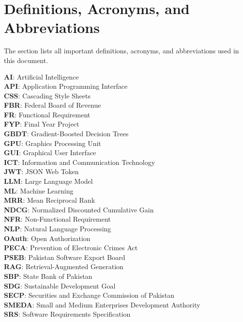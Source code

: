 \documentclass{FastFyp}
\begin{document}
\section{Definitions, Acronyms, and Abbreviations}\label{sec:defs}
The section lists all important definitions, acronyms, and abbreviations used in this document.

\textbf{AI}: Artificial Intelligence\\
\textbf{API}: Application Programming Interface\\
\textbf{CSS}: Cascading Style Sheets\\
\textbf{FBR}: Federal Board of Revenue\\
\textbf{FR}: Functional Requirement\\
\textbf{FYP}: Final Year Project\\
\textbf{GBDT}: Gradient-Boosted Decision Trees\\
\textbf{GPU}: Graphics Processing Unit\\
\textbf{GUI}: Graphical User Interface\\
\textbf{ICT}: Information and Communication Technology\\
\textbf{JWT}: JSON Web Token\\
\textbf{LLM}: Large Language Model\\
\textbf{ML}: Machine Learning\\
\textbf{MRR}: Mean Reciprocal Rank\\
\textbf{NDCG}: Normalized Discounted Cumulative Gain\\
\textbf{NFR}: Non-Functional Requirement\\
\textbf{NLP}: Natural Language Processing\\
\textbf{OAuth}: Open Authorization\\
\textbf{PECA}: Prevention of Electronic Crimes Act\\
\textbf{PSEB}: Pakistan Software Export Board\\
\textbf{RAG}: Retrieval-Augmented Generation\\
\textbf{SBP}: State Bank of Pakistan\\
\textbf{SDG}: Sustainable Development Goal\\
\textbf{SECP}: Securities and Exchange Commission of Pakistan\\
\textbf{SMEDA}: Small and Medium Enterprises Development Authority\\
\textbf{SRS}: Software Requirements Specification
\end{document}

